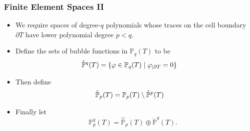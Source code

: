 \documentclass[aspectratio=169,xcolor=dvipsnames,11pt]{beamer}
\begin{document}
\begin{frame}\frametitle{Finite Element Spaces II}
\begin{itemize}
\item We require spaces of degree-$q$ polynomials whose traces on the cell boundary $\partial T$ have lower polynomial degree $p < q$.
\item Define the sets of bubble functions in $\mathbb{P}_{q}(T)$
 to be 
\[
\aligned
\mathring{\mathbb{P}}^{q}(T) &= \{ \varphi \in \mathbb{P}_{q}(T) \mid \varphi_{|\partial T} =  0\}%
\endaligned
\]
\item Then define 
\[
\aligned
\hat{\mathbb{P}}_{p}(T) &= \mathbb{P}_{p}(T) \setminus \mathring{\mathbb{P}}^{p}(T)%
\endaligned
\]
\item Finally
let
\begin{equation}
	\mathbb{P}_p^q(T) = \hat{\mathbb{P}}_{p}(T) \oplus \mathring{\mathbb{P}}^{q}(T).
\end{equation}
\end{itemize}
\end{frame}
\end{document}
